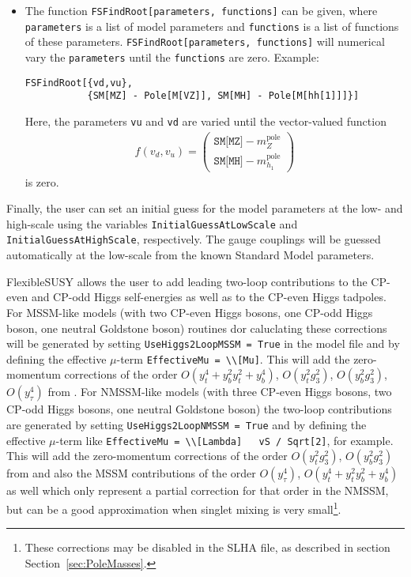 \documentclass[final,3p,11pt,pdflatex]{elsarticle}
\makeatletter
\newcommand{\fs}{FlexibleSUSY\@\xspace}
\newcommand{\code}[1]{\lstinline|#1|}  %
\newcommand{\pole}{\text{pole}}
\newcommand{\secref}[1]{Section~\ref{#1}}
\makeatother
\begin{document}
\begin{itemize}
\item The function \code{FSFindRoot[parameters, functions]} can be
  given, where \code{parameters} is a list of model parameters and
  \code{functions} is a list of functions of these parameters.
  \code{FSFindRoot[parameters, functions]} will numerical vary the
  \code{parameters} until the \code{functions} are zero.  Example:
  \begin{lstlisting}
FSFindRoot[{vd,vu},
           {SM[MZ] - Pole[M[VZ]], SM[MH] - Pole[M[hh[1]]]}]
  \end{lstlisting}
  Here, the parameters \code{vu} and \code{vd} are varied until the
  vector-valued function
  \begin{align}
    f(v_d,v_u) =
    \begin{pmatrix}
      \texttt{SM[MZ]} - m_Z^\pole \\
      \texttt{SM[MH]} - m_{h_1}^\pole
    \end{pmatrix}
  \end{align}
  is zero.
\end{itemize}
%
Finally, the user can set an initial guess for the model parameters at
the low- and high-scale using the variables
\code{InitialGuessAtLowScale} and \code{InitialGuessAtHighScale},
respectively.  The gauge couplings will be guessed automatically at
the low-scale from the known Standard Model parameters.

\fs allows the user to add leading two-loop contributions to the
CP-even and CP-odd Higgs self-energies as well as to the CP-even Higgs
tadpoles.  For MSSM-like models (with two CP-even Higgs bosons, one
CP-odd Higgs boson, one neutral Goldstone boson) routines dor
caluclating these corrections will be generated by setting
\code{UseHiggs2LoopMSSM = True} in the model file and by defining the
effective $\mu$-term \code{EffectiveMu = \\[Mu]}.  This will add the
zero-momentum corrections of the order $O(y_t^4 + y_b^2 y_t^2 +
y_b^4)$, $O(y_t^2 g_3^2)$, $O(y_b^2 g_3^2)$, $O(y_\tau^4)$ from
\cite{Degrassi:2001yf,Brignole:2001jy,Dedes:2002dy,Brignole:2002bz,Dedes:2003km}.
For NMSSM-like models (with three CP-even Higgs bosons, two CP-odd
Higgs bosons, one neutral Goldstone boson) the two-loop contributions
are generated by setting \code{UseHiggs2LoopNMSSM = True} and by
defining the effective $\mu$-term like \code{EffectiveMu = \\[Lambda]
  vS / Sqrt[2]}, for example.  This will add the zero-momentum
corrections of the order $O(y_t^2 g_3^2)$, $O(y_b^2 g_3^2)$ from
\cite{Degrassi:2009yq} and also the MSSM contributions of the order
$O(y_\tau^4)$, $O(y_t^4 + y_t^2 y_b^2 + y_b^4)$ as well
\cite{Brignole:2001jy,Dedes:2003km} which only represent a partial
correction for that order in the NMSSM, but can be a good
approximation when singlet mixing is very small\footnote{These
  corrections may be disabled in the SLHA file, as described in
  section \secref{sec:PoleMasses}.}.
\end{document}
